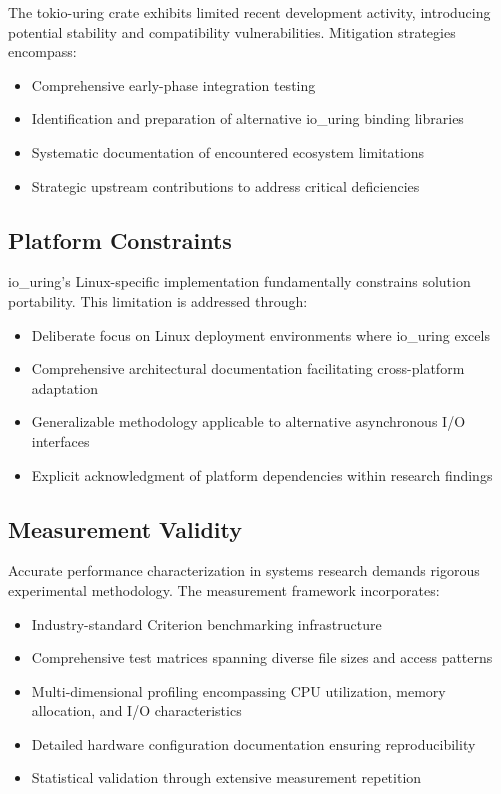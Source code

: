 \documentclass{article}
\begin{document}
The tokio-uring crate exhibits limited recent development activity, introducing potential stability and compatibility vulnerabilities. Mitigation strategies encompass:
\begin{itemize}
\item Comprehensive early-phase integration testing
\item Identification and preparation of alternative io\_uring binding libraries
\item Systematic documentation of encountered ecosystem limitations
\item Strategic upstream contributions to address critical deficiencies
\end{itemize}

\subsection{Platform Constraints}

io\_uring's Linux-specific implementation fundamentally constrains solution portability. This limitation is addressed through:
\begin{itemize}
\item Deliberate focus on Linux deployment environments where io\_uring excels
\item Comprehensive architectural documentation facilitating cross-platform adaptation
\item Generalizable methodology applicable to alternative asynchronous I/O interfaces
\item Explicit acknowledgment of platform dependencies within research findings
\end{itemize}

\subsection{Measurement Validity}

Accurate performance characterization in systems research demands rigorous experimental methodology. The measurement framework incorporates:
\begin{itemize}
\item Industry-standard Criterion benchmarking infrastructure
\item Comprehensive test matrices spanning diverse file sizes and access patterns
\item Multi-dimensional profiling encompassing CPU utilization, memory allocation, and I/O characteristics
\item Detailed hardware configuration documentation ensuring reproducibility
\item Statistical validation through extensive measurement repetition
\end{itemize}
\end{document}
